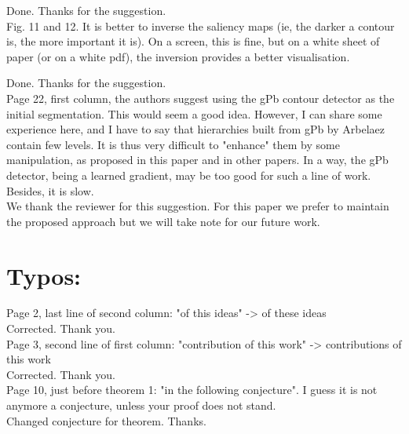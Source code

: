 \documentclass[a4paper,10pt]{report}
\begin{document}
\que Done. Thanks for the suggestion.\\

\que Fig. 11 and 12. It is better to inverse the saliency maps (ie, the 
darker a contour is, the more important it is). On a screen, this is 
fine, but on a white sheet of paper (or on a white pdf), the inversion 
provides a better visualisation. 

\ans Done. Thanks for the suggestion.\\

\que Page 22, first column, the authors suggest using the gPb contour 
detector as the initial segmentation. This would seem a good 
idea. However, I can share some experience here, and I have to say 
that hierarchies built from gPb by Arbelaez contain few levels. It is 
thus very difficult to "enhance" them by some manipulation, as 
proposed in this paper and in other papers. In a way, the gPb 
detector, being a learned gradient, may be too good for such a line of 
work. Besides, it is slow. \\

\ans We thank the reviewer for this suggestion. For this paper we prefer to maintain the proposed approach but we will take note for our future work.\\

\section{Typos:} 


\que Page 2, last line of second column: "of this ideas" -> of these ideas\\

\ans Corrected. Thank you.\\

\que Page 3, second line of first column: "contribution of this work" -> contributions of this work \\

\ans Corrected. Thank you.\\

\que Page 10, just before theorem 1: "in the following conjecture". I 
guess it is not anymore a conjecture, unless your proof does not 
stand. \\

\ans Changed conjecture for theorem. Thanks.\\
\end{document}
